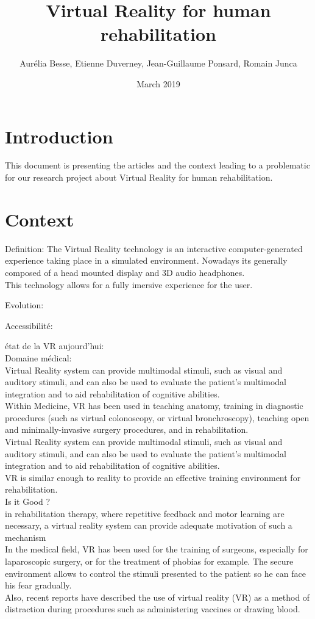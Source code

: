 \documentclass{article}
\title{Virtual Reality for human rehabilitation}
\author{ Aurélia Besse, Etienne Duverney, Jean-Guillaume Ponsard, Romain Junca }
\date{March 2019}
\begin{document}
\maketitle

\section{Introduction}

This document is presenting the articles and the context leading to a problematic for our research project about Virtual Reality for human rehabilitation.


\section{Context}

Definition:
The Virtual Reality technology is an interactive computer-generated experience taking place in a simulated environment. Nowadays its generally composed of a head mounted display and 3D audio headphones. \\
This technology allows for a fully imersive experience for the user.

Evolution:


Accessibilité:


état de la VR aujourd'hui: \\



Domaine médical: \\
Virtual Reality system can provide multimodal stimuli, such as visual and auditory stimuli, and can also be used to evaluate the patient’s multimodal integration and to aid rehabilitation of cognitive abilities. \\
Within Medicine, VR has been used in teaching anatomy, training in diagnostic procedures (such as virtual colonoscopy, or virtual bronchroscopy), teaching open and minimally-invasive surgery procedures, and in rehabilitation. \\
Virtual Reality system can provide multimodal stimuli, such as visual and auditory stimuli, and can also be used to evaluate the patient’s multimodal integration and to aid rehabilitation of cognitive abilities. \\

VR is similar enough to reality to provide an effective training environment for rehabilitation. \\


Is it Good ? \\
in rehabilitation therapy, where repetitive feedback and motor learning are necessary, a virtual reality system can provide adequate motivation of such a mechanism \\
In the medical field, VR has been used for the training of surgeons, especially for laparoscopic surgery, or for the treatment of phobias for example. The secure environment allows to control the stimuli presented to the patient so he can face his fear gradually. \\
Also, recent reports have described the use of virtual reality (VR) as a method of distraction during
procedures such as administering vaccines or drawing blood. \\
\end{document}
